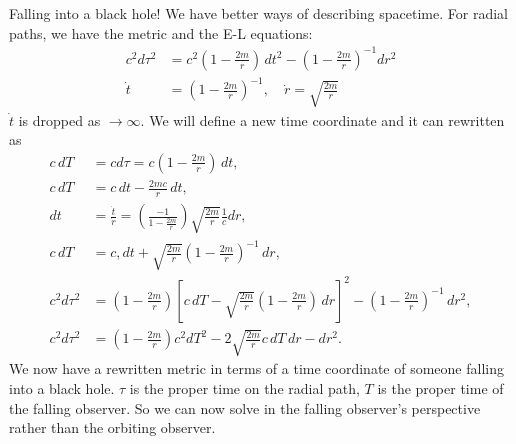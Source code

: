 \documentclass[a4paper, 11pt, normalem]{report}
\begin{document}
\chapter{}
Falling into a black hole!
We have better ways of describing spacetime.
For radial paths, we have the metric and the E-L equations:
\begin{align}
    c^2d\tau^2 &= c^2\left(1-\frac{2m}{r}\right)\,dt^2 - \left(1-\frac{2m}{r}\right)^{-1}dr^2 \\
    \dot{t} &= \left(1-\frac{2m}{r}\right)^{-1},\quad \dot{r} = \sqrt{\frac{2m}{r}}
\end{align}
$\dot{t}$ is dropped as $\to\infty$.
We will define a new time coordinate and it can rewritten as
\begin{align}
    c\,dT &= cd\tau = c\left(1-\frac{2m}{r}\right)\,dt, \\
    c\,dT &= c\,dt - \frac{2mc}{r}\,dt,\\
    dt &= \frac{\dot{t}}{\dot{r}} = \left(\frac{-1}{1-\frac{2m}{r}}\right)\sqrt{\frac{2m}{r}}\frac{1}{c}dr, \\
    c\,dT &= c,dt + \sqrt{\frac{2m}{r}}\left(1-\frac{2m}{r}\right)^{-1}\,dr, \\
    c^2d\tau^2 &= \left(1-\frac{2m}{r}\right)\left[c\,dT - \sqrt{\frac{2m}{r}}\left(1-\frac{2m}{r}\right)\,dr\right]^2 - \left(1-\frac{2m}{r}\right)^{-1}\,dr^2, \\
    c^2d\tau^2 &= \left(1-\frac{2m}{r}\right)c^2dT^2 - 2\sqrt{\frac{2m}{r}}c\,dT\,dr - dr^2.
\end{align}
We now have a rewritten metric in terms of a time coordinate of someone falling into a black hole.
$\tau$ is the proper time on the radial path, $T$ is the proper time of the falling observer.
So we can now solve in the falling observer's perspective rather than the orbiting observer.
\end{document}
